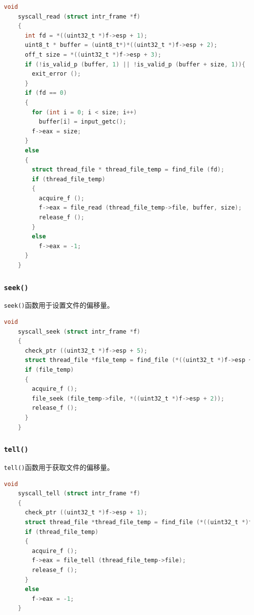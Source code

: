 \documentclass{article}
\begin{document}
\begin{lstlisting}[language=C, title=\texttt{src/userprog/syscall.c - syscall\_read()}]
    void
    syscall_read (struct intr_frame *f)
    {
      int fd = *((uint32_t *)f->esp + 1);
      uint8_t * buffer = (uint8_t*)*((uint32_t *)f->esp + 2);
      off_t size = *((uint32_t *)f->esp + 3);
      if (!is_valid_p (buffer, 1) || !is_valid_p (buffer + size, 1)){
        exit_error ();
      }
      if (fd == 0)
      {
        for (int i = 0; i < size; i++)
          buffer[i] = input_getc();
        f->eax = size;
      }
      else
      {
        struct thread_file * thread_file_temp = find_file (fd);
        if (thread_file_temp)
        {
          acquire_f ();
          f->eax = file_read (thread_file_temp->file, buffer, size);
          release_f ();
        } 
        else
          f->eax = -1;
      }
    }
\end{lstlisting}

\subsubsection{\texttt{seek()}}

\texttt{seek()}函数用于设置文件的偏移量。

\begin{lstlisting}[language=C, title=\texttt{src/userprog/syscall.c - syscall\_seek()}]
    void
    syscall_seek (struct intr_frame *f)
    {
      check_ptr ((uint32_t *)f->esp + 5);
      struct thread_file *file_temp = find_file (*((uint32_t *)f->esp + 1));
      if (file_temp)
      {
        acquire_f ();
        file_seek (file_temp->file, *((uint32_t *)f->esp + 2));
        release_f ();
      }
    }
\end{lstlisting}

\subsubsection{\texttt{tell()}}

\texttt{tell()}函数用于获取文件的偏移量。

\begin{lstlisting}[language=C, title=\texttt{src/userprog/syscall.c - syscall\_tell()}]
    void
    syscall_tell (struct intr_frame *f)
    {
      check_ptr ((uint32_t *)f->esp + 1);
      struct thread_file *thread_file_temp = find_file (*((uint32_t *)f->esp + 1));
      if (thread_file_temp)
      {
        acquire_f ();
        f->eax = file_tell (thread_file_temp->file);
        release_f ();
      }
      else
        f->eax = -1;
    }
\end{lstlisting}
\end{document}
